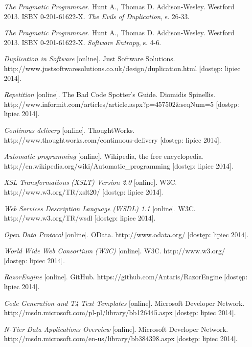 \begin{thebibliography}{}

  \emph{The Pragmatic Programmer.}
  Hunt A., Thomas D.
  Addison-Wesley.
  Westford 2013.
  ISBN 0-201-61622-X.
  \emph{The Evils of Duplication}, s. 26-33.
 
  \emph{The Pragmatic Programmer.}
  Hunt A., Thomas D.
  Addison-Wesley.
  Westford 2013.
  ISBN 0-201-61622-X.
  \emph{Software Entropy}, s. 4-6.
 
  \emph{Duplication in Software} [online].
  Just Software Solutions.
  http://www.justsoftwaresolutions.co.uk/design/duplication.html [dostęp: lipiec 2014].
  
  \emph{Repetition} [online].
  The Bad Code Spotter's Guide.
  Diomidis Spinellis.
  http://www.informit.com/articles/article.aspx?p=457502\&seqNum=5 [dostęp: lipiec 2014].
 
  \emph{Continous delivery} [online].
  ThoughtWorks.
  http://www.thoughtworks.com/continuous-delivery [dostęp: lipiec 2014].
 
  \emph{Automatic programming} [online].
  Wikipedia, the free encyclopedia.
  http://en.wikipedia.org/wiki/Automatic\_programming [dostęp: lipiec 2014].
 
  \emph{XSL Transformations (XSLT) Version 2.0} [online].
  W3C.
  http://www.w3.org/TR/xslt20/ [dostęp: lipiec 2014].
 
  \emph{Web Services Description Language (WSDL) 1.1} [online].
  W3C.
  http://www.w3.org/TR/wsdl [dostęp: lipiec 2014].
 
  \emph{Open Data Protocol} [online].
  OData.
  http://www.odata.org/ [dostęp: lipiec 2014].
 
  \emph{World Wide Web Consortium (W3C)} [online].
  W3C.
  http://www.w3.org/ [dostęp: lipiec 2014].
 
  \emph{RazorEngine} [online].
  GitHub.
  https://github.com/Antaris/RazorEngine [dostęp: lipiec 2014].

  \emph{Code Generation and T4 Text Templates} [online].
  Microsoft Developer Network.
  http://msdn.microsoft.com/pl-pl/library/bb126445.aspx [dostęp: lipiec 2014].
 
  \emph{N-Tier Data Applications Overview} [online].
  Microsoft Developer Network.
  http://msdn.microsoft.com/en-us/library/bb384398.aspx [dostęp: lipiec 2014].
 

\end{thebibliography}
